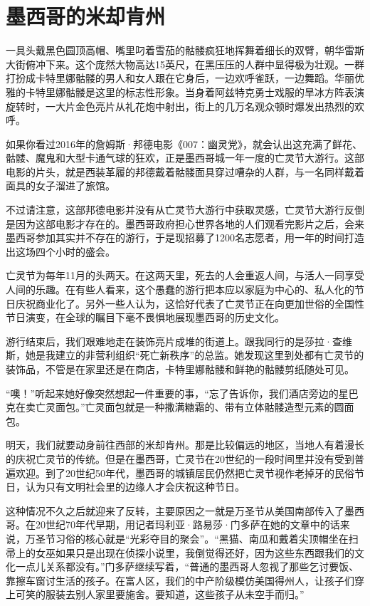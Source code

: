 \documentclass[12pt,oneside]{book}
\begin{document}
\section{墨西哥的米却肯州}
\begin{bookref}[frametitle={\cite{好好告别}}]
一具头戴黑色圆顶高帽、嘴里叼着雪茄的骷髅疯狂地挥舞着细长的双臂，朝华雷斯大街俯冲下来。这个庞然大物高达15英尺，在黑压压的人群中显得极为壮观。一群打扮成卡特里娜骷髅的男人和女人跟在它身后，一边欢呼雀跃，一边舞蹈。华丽优雅的卡特里娜骷髅是这里的标志性形象。当身着阿兹特克勇士戏服的旱冰方阵表演旋转时，一大片金色亮片从礼花炮中射出，街上的几万名观众顿时爆发出热烈的欢呼。

如果你看过2016年的詹姆斯·邦德电影《007：幽灵党》，就会认出这充满了鲜花、骷髅、魔鬼和大型卡通气球的狂欢，正是墨西哥城一年一度的亡灵节大游行。这部电影的片头，就是西装革履的邦德戴着骷髅面具穿过嘈杂的人群，与一名同样戴着面具的女子溜进了旅馆。

不过请注意，这部邦德电影并没有从亡灵节大游行中获取灵感，亡灵节大游行反倒是因为这部电影才存在的。墨西哥政府担心世界各地的人们观看完影片之后，会来墨西哥参加其实并不存在的游行，于是现招募了1200名志愿者，用一年的时间打造出这场四个小时的盛会。

亡灵节为每年11月的头两天。在这两天里，死去的人会重返人间，与活人一同享受人间的乐趣。在有些人看来，这个愚蠢的游行把本应以家庭为中心的、私人化的节日庆祝商业化了。另外一些人认为，这恰好代表了亡灵节正在向更加世俗的全国性节日演变，在全球的瞩目下毫不畏惧地展现墨西哥的历史文化。

游行结束后，我们艰难地走在装饰亮片成堆的街道上。跟我同行的是莎拉·查维斯，她是我建立的非营利组织“死亡新秩序”的总监。她发现这里到处都有亡灵节的装饰品，不管是在家里还是在商店，卡特里娜骷髅和鲜艳的骷髅剪纸随处可见。

“噢！”听起来她好像突然想起一件重要的事，“忘了告诉你，我们酒店旁边的星巴克在卖亡灵面包。”亡灵面包就是一种撒满糖霜的、带有立体骷髅造型元素的圆面包。

明天，我们就要动身前往西部的米却肯州。那是比较偏远的地区，当地人有着漫长的庆祝亡灵节的传统。但是在墨西哥，亡灵节在20世纪的一段时间里并没有受到普遍欢迎。到了20世纪50年代，墨西哥的城镇居民仍然把亡灵节视作老掉牙的民俗节日，认为只有文明社会里的边缘人才会庆祝这种节日。

这种情况不久之后就迎来了反转，主要原因之一就是万圣节从美国南部传入了墨西哥。在20世纪70年代早期，用记者玛利亚·路易莎·门多萨在她的文章中的话来说，万圣节习俗的核心就是“光彩夺目的聚会”。“黑猫、南瓜和戴着尖顶帽坐在扫帚上的女巫如果只是出现在侦探小说里，我倒觉得还好，因为这些东西跟我们的文化一点儿关系都没有。”门多萨继续写着，“普通的墨西哥人忽视了那些乞讨要饭、靠擦车窗讨生活的孩子。在富人区，我们的中产阶级模仿美国得州人，让孩子们穿上可笑的服装去别人家里要施舍。要知道，这些孩子从未空手而归。”


\end{bookref}
\end{document}
